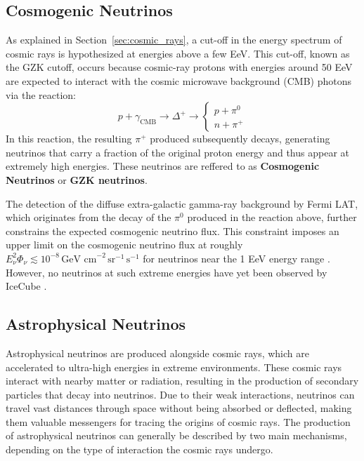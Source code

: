 \subsection{Cosmogenic Neutrinos}
\label{sec:cosmogenic_nu}
As explained in Section~\ref{sec:cosmic_rays}, a cut-off in the energy spectrum of cosmic rays is hypothesized at energies above a few EeV. This cut-off, known as the GZK cutoff, occurs because cosmic-ray protons with energies around 50 EeV are expected to interact with the cosmic microwave background (CMB) photons via the reaction:
\[
p + \gamma_{\text{CMB}} \rightarrow \Delta^+ \rightarrow \begin{cases} p + \pi^0 \\ n + \pi^+ \end{cases}
\]
In this reaction, the resulting $\pi^+$ produced subsequently decays, generating neutrinos that carry a fraction of the original proton energy and thus appear at extremely high energies. These neutrinos are reffered to as \textbf{Cosmogenic Neutrinos} or \textbf{GZK neutrinos}.

The detection of the diffuse extra-galactic gamma-ray background by Fermi LAT, which originates from the decay of the $\pi^0$ produced in the reaction above, further constrains the expected cosmogenic neutrino flux. This constraint imposes an upper limit on the cosmogenic neutrino flux at roughly \( E_\nu^2 \Phi_\nu \lesssim 10^{-8} \, \text{GeV cm}^{-2} \, \text{sr}^{-1} \, \text{s}^{-1} \) for neutrinos near the 1 EeV energy range . However, no neutrinos at such extreme energies have yet been observed by IceCube .

\subsection{Astrophysical Neutrinos}
\label{sec:astro_nu}
Astrophysical neutrinos are produced alongside cosmic rays, which are accelerated to ultra-high energies in extreme environments. These cosmic rays interact with nearby matter or radiation, resulting in the production of secondary particles that decay into neutrinos. Due to their weak interactions, neutrinos can travel vast distances through space without being absorbed or deflected, making them valuable messengers for tracing the origins of cosmic rays. The production of astrophysical neutrinos can generally be described by two main mechanisms, depending on the type of interaction the cosmic rays undergo.

